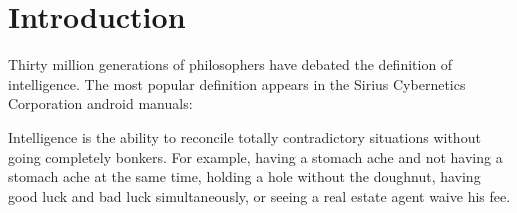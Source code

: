 \chapter{Introduction}
Thirty million generations of philosophers have debated the definition of intelligence. The most popular definition appears in the Sirius Cybernetics Corporation android manuals:

Intelligence is the ability to reconcile totally contradictory situations without going completely bonkers. For example, having a stomach ache and not having a stomach ache at the same time, holding a hole without the doughnut, having good luck and bad luck simultaneously, or seeing a real estate agent waive his fee.
